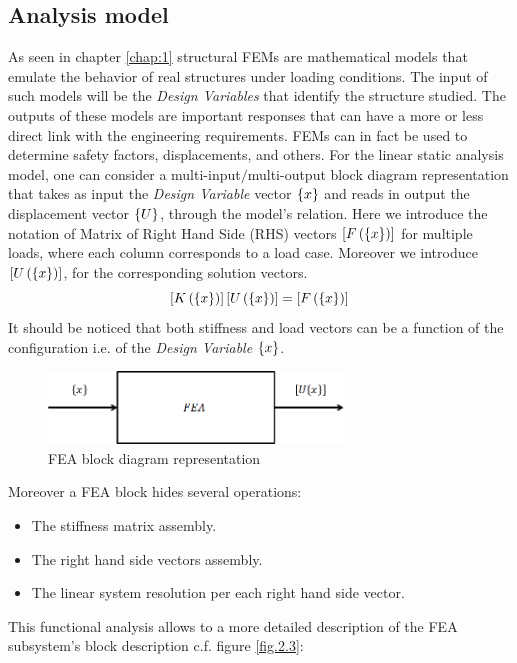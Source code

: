 \subsection {Analysis model}
As seen in chapter \ref{chap:1} structural FEMs are mathematical models that emulate the behavior of real structures under loading conditions. The input of such models will be the \textit{Design Variables} that identify the structure studied. The outputs of these models are important responses that can have a more or less direct link with the engineering requirements. FEMs can in fact be used to determine safety factors, displacements, and others. For the linear static analysis model, one can consider a multi-input$/$multi-output block diagram representation that takes as input the \textit{Design Variable} vector $\left\lbrace{x}\right \rbrace$ and reads in output the displacement vector $\left\lbrace{U}\right \rbrace$, through the model's relation. Here we introduce the notation of Matrix of Right Hand Side (RHS) vectors $\left[{F\left(\left\lbrace{x}\right \rbrace\right)}\right]$ for multiple loads, where each column corresponds to a load case. Moreover we introduce $\left[{U\left(\left\lbrace{x}\right \rbrace\right)}\right]$, for the corresponding solution vectors.
\begin{equation}
\label{eq2.1}
\left[{K\left(\left\lbrace{x}\right \rbrace\right)}\right]\left[{U\left(\left\lbrace{x}\right \rbrace\right)}\right]=\left[{F\left(\left\lbrace{x}\right \rbrace\right)}\right]
\end{equation}
It should be noticed that both stiffness and load vectors can be a function of the configuration i.e. of the  \textit{Design Variable} $\left\lbrace{x}\right \rbrace$.
\begin{figure}[ht]
\centering
\includegraphics[width=8cm]{images/Ch2/Block_diagram_FEA}
\caption{FEA block diagram representation}
\label{fig.2.2}
\end{figure}
Moreover a FEA block hides several operations:
\begin{itemize}
\item The stiffness matrix assembly.
\item The right hand side vectors assembly.
\item The linear system resolution per each right hand side vector.
\end{itemize}
This functional analysis allows to a more detailed description of the FEA subsystem's block description c.f. figure \ref{fig.2.3}:\\
